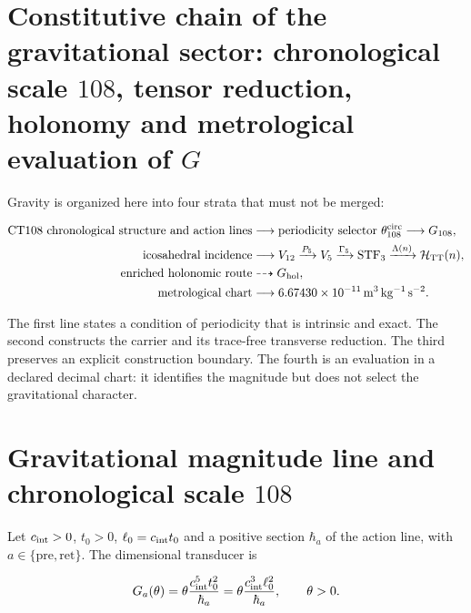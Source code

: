 \label{ch:gravity}

\section{Constitutive chain of the gravitational sector: chronological scale \(108\), tensor reduction, holonomy and metrological evaluation of \(G\)}

Gravity is organized here into four strata that must not be merged:

\begin{equation}
\label{eq:gravity-causal-chain}
\begin{aligned}
\text{CT108 chronological structure and action lines}
&\longrightarrow \text{periodicity selector }\theta_{108}^{\rm circ}
\longrightarrow G_{108},\\
\text{icosahedral incidence}
&\longrightarrow V_{12}\xrightarrow{P_5}V_5
\xrightarrow{\Gamma_5}\operatorname{STF}_3
\xrightarrow{\Lambda(n)}\mathcal H_{\rm TT}(n),\\
\text{enriched holonomic route}
&\dashrightarrow G_{\rm hol},\\
\text{metrological chart}
&\longrightarrow 6.67430\times10^{-11}\,
\mathrm{m^3\,kg^{-1}\,s^{-2}}.
\end{aligned}
\end{equation}

The first line states a condition of periodicity that is intrinsic and exact.
The second constructs the carrier and its trace-free transverse reduction. The third preserves an
explicit construction boundary. The fourth is an evaluation in a
declared decimal chart: it identifies the magnitude but does not select the gravitational
character.

\section{Gravitational magnitude line and chronological scale \(108\)}

Let \(c_{\rm int}>0\), \(t_0>0\),
\(\ell_0=c_{\rm int}t_0\) and a positive section
\(\hbar_a\) of the action line, with
\(a\in\{\mathrm{pre},\mathrm{ret}\}\). The dimensional transducer is

\begin{equation}
\label{eq:gravity-transducer}
G_a(\theta)
=\theta\frac{c_{\rm int}^{5}t_0^2}{\hbar_a}
=\theta\frac{c_{\rm int}^{3}\ell_0^2}{\hbar_a},
\qquad \theta>0.
\end{equation}

